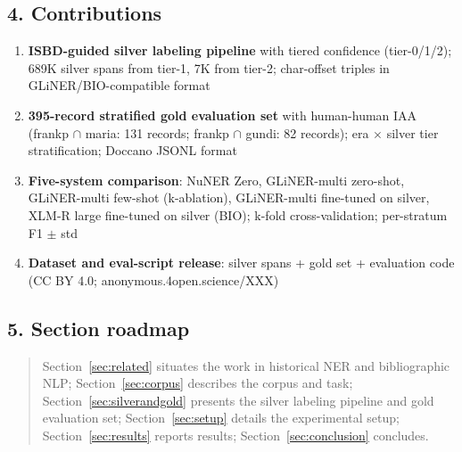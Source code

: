 \subsection*{4. Contributions}
\begin{enumerate}
    \item \textbf{ISBD-guided silver labeling pipeline} with tiered confidence
          (tier-0/1/2); 689K silver spans from tier-1, 7K from tier-2;
          char-offset triples in GLiNER/BIO-compatible format
    \item \textbf{395-record stratified gold evaluation set} with human-human IAA
          (frankp $\cap$ maria: 131 records; frankp $\cap$ gundi: 82 records);
          era $\times$ silver tier stratification; Doccano JSONL format
    \item \textbf{Five-system comparison}: NuNER Zero, GLiNER-multi zero-shot,
          GLiNER-multi few-shot (k-ablation), GLiNER-multi fine-tuned on silver,
          XLM-R large fine-tuned on silver (BIO); k-fold cross-validation;
          per-stratum F1 $\pm$ std
    \item \textbf{Dataset and eval-script release}: silver spans + gold set +
          evaluation code (CC BY 4.0; anonymous.4open.science/XXX)
\end{enumerate}
%

\subsection*{5. Section roadmap}
\begin{quote}
    Section~\ref{sec:related} situates the work in historical NER and
    bibliographic NLP; Section~\ref{sec:corpus} describes the corpus and task;
    Section~\ref{sec:silverandgold} presents the silver labeling pipeline and
    gold evaluation set; Section~\ref{sec:setup} details the experimental setup;
    Section~\ref{sec:results} reports results; Section~\ref{sec:conclusion} concludes.
\end{quote}

